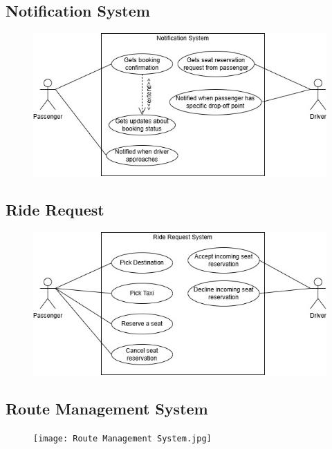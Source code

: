 \documentclass[a4paper,12pt]{article}
\begin{document}
    \subsection*{Notification System}
    \begin{figure}[H]
      \centering
      \includegraphics[width=1\textwidth]{Notification System.jpg} 
    \end{figure}
     \subsection*{Ride Request}
    \begin{figure}[H]
      \centering
      \includegraphics[width=1\textwidth]{Ride Request System.jpg} 
    \end{figure}
     \subsection*{Route Management System}
    \begin{figure}[H]
      \centering
      \texttt{[image: Route Management System.jpg]} 
    \end{figure}
\end{document}
